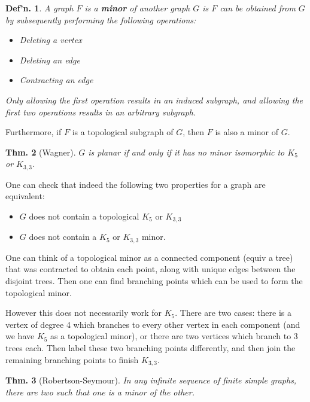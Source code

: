 \documentclass[12pt, a4paper]{book}
\newtheorem{theorem}{Thm.}[section]
\newtheorem{definition}[theorem]{Def'n.}
\theoremstyle{nonumberplain}
\begin{document}
\begin{definition}
    A graph $F$ is a \textbf{minor} of another graph $G$ is $F$ can be obtained from $G$ by subsequently performing the following operations:
    \begin{itemize}[nolistsep]
        \item Deleting a vertex
        \item Deleting an edge
        \item Contracting an edge
    \end{itemize}
    Only allowing the first operation results in an induced subgraph, and allowing the first two operations results in an arbitrary subgraph.
\end{definition}
Furthermore, if $F$ is a topological subgraph of $G$, then $F$ is also a minor of $G$.
\begin{theorem}[Wagner]
    $G$ is planar if and only if it has no minor isomorphic to $K_5$ or $K_{3,3}$.
\end{theorem}
One can check that indeed the following two properties for a graph are equivalent:
\begin{itemize}[nolistsep]
    \item $G$ does not contain a topological $K_5$ or $K_{3,3}$
    \item $G$ does not contain a $K_5$ or $K_{3,3}$ minor.
\end{itemize}
One can think of a topological minor as a connected component (equiv a tree) that was contracted to obtain each point, along with unique edges between the disjoint trees.
Then one can find branching points which can be used to form the topological minor.

However this does not necessarily work for $K_5$.
There are two cases: there is a vertex of degree 4 which branches to every other vertex in each component (and we have $K_5$ as a topological minor), or there are two vertices which branch to 3 trees each.
Then label these two branching points differently, and then join the remaining branching points to finish $K_{3,3}$.
\begin{theorem}[Robertson-Seymour]
    In any infinite sequence of finite simple graphs, there are two such that one is a minor of the other.
\end{theorem}
\end{document}
